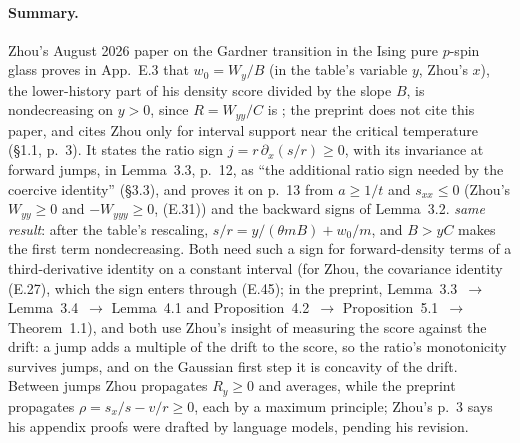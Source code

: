 \documentclass[11pt]{article}
\newcommand{\ploc}[2]{#1}
\newcommand{\sloc}[2]{\cite[#2]{#1}}
\newcommand{\rel}[1]{\textit{#1}}
\begin{document}
\paragraph{Summary.}
Zhou's August 2026 paper on the Gardner transition in the Ising pure $p$-spin
glass proves in App.~E.3 that $w_0=W_y/B$ (in the table's variable $y$,
Zhou's $x$), the lower-history part of his density score divided by the slope
$B$, is nondecreasing on $y>0$, since $R=W_{yy}/C$ is
\sloc{Zhou2026-GardnerTransitionIsingPurePSpinII}{(E.37), (E.41), p.~128};
the preprint does not cite this paper, and cites Zhou only for interval
support near the critical temperature \cite{Zhou2025-FRSBSKLowTemperature}
(\ploc{\S1.1, p.~3}{main.tex:189--190}).
It states the ratio sign $j=r\,\partial_x(s/r)\ge0$, with its invariance at
forward jumps, in \ploc{Lemma~3.3, p.~12}{signs.tex:289--297}, as ``the
additional ratio sign needed by the coercive identity''
(\ploc{\S3.3}{signs.tex:287}), and proves it on
\ploc{p.~13}{signs.tex:338--393} from $a\ge1/t$ and $s_{xx}\le0$ (Zhou's
$W_{yy}\ge0$ and $-W_{yyy}\ge0$, (E.31)) and the backward signs of
\ploc{Lemma~3.2}{signs.tex:195--203}.
\rel{same result}: after the table's rescaling, $s/r=y/(\theta mB)+w_0/m$, and
$B>yC$ \sloc{Zhou2026-GardnerTransitionIsingPurePSpinII}{p.~130} makes the
first term nondecreasing.
Both need such a sign for forward-density terms of a third-derivative identity
on a constant interval (for Zhou, the covariance identity (E.27), which the
sign enters through (E.45); in the preprint,
Lemma~3.3~$\to$ \ploc{Lemma~3.4}{signs.tex:416--433}~$\to$
\ploc{Lemma~4.1 and Proposition~4.2}{certificate.tex:117--193}~$\to$
\ploc{Proposition~5.1}{curvature.tex:9--20}~$\to$
\ploc{Theorem~1.1}{main.tex:119--131}), and both use Zhou's insight of
measuring the score against the drift: a jump adds a multiple of the drift to
the score, so the ratio's monotonicity survives jumps, and on the Gaussian
first step it is concavity of the drift.
Between jumps Zhou propagates $R_y\ge0$ and averages, while the preprint
propagates $\rho=s_x/s-v/r\ge0$, each by a maximum principle; Zhou's p.~3 says
his appendix proofs were drafted by language models, pending his revision.
\end{document}
